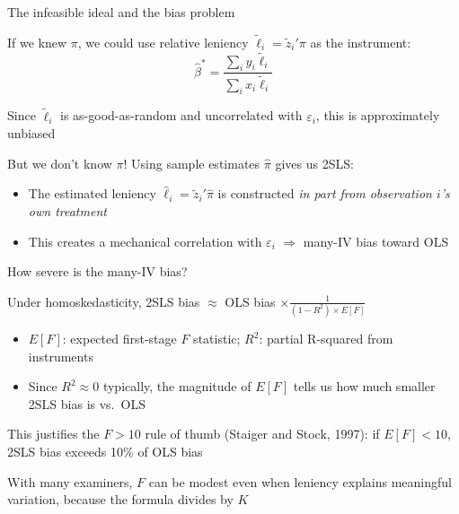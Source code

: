 \documentclass[notes,11pt, aspectratio=169]{beamer}
\newenvironment{wideitemize}{\itemize\addtolength{\itemsep}{10pt}}{\enditemize}
\begin{document}
\begin{frame}{The infeasible ideal and the bias problem}
  \begin{wideitemize}
  \item If we knew $\pi$, we could use relative leniency $\tilde{\ell}_{i} = \tilde{z}_{i}'\pi$ as the instrument:
    \begin{equation*}
      \hat{\beta}^{*} = \frac{\sum_{i} y_{i} \tilde{\ell}_{i}}{\sum_{i} x_{i} \tilde{\ell}_{i}}
    \end{equation*}
  \item Since $\tilde{\ell}_{i}$ is as-good-as-random and uncorrelated with $\varepsilon_{i}$, this is approximately unbiased
  \item But we don't know $\pi$! Using sample estimates $\hat{\pi}$ gives us 2SLS:
    \begin{itemize}
    \item The estimated leniency $\hat{\ell}_{i} = \tilde{z}_{i}'\hat{\pi}$ is constructed \emph{in part from observation $i$'s own treatment}
    \item This creates a mechanical correlation with $\varepsilon_{i}$ $\Rightarrow$ many-IV bias toward OLS
    \end{itemize}
  \end{wideitemize}
\end{frame}


\begin{frame}{How severe is the many-IV bias?}
  \begin{wideitemize}
  \item Under homoskedasticity, 2SLS bias $\approx$ OLS bias $\times \frac{1}{(1-R^{2}) \times E[F]}$
    \begin{itemize}
    \item $E[F]$: expected first-stage $F$ statistic; $R^{2}$: partial R-squared from instruments
    \item Since $R^{2} \approx 0$ typically, the magnitude of $E[F]$ tells us how much smaller 2SLS bias is vs.\ OLS
    \end{itemize}
  \item This justifies the $F > 10$ rule of thumb (Staiger and Stock, 1997): if $E[F] < 10$, 2SLS bias exceeds 10\% of OLS bias
  \item With many examiners, $F$ can be modest even when leniency explains meaningful variation, because the formula divides by $K$
  \end{wideitemize}
\end{frame}
\end{document}

